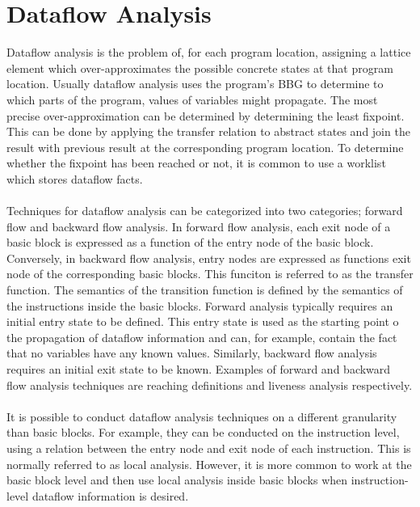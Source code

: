 \documentclass{kththesis}
\begin{document}
\section{Dataflow Analysis}
Dataflow analysis is the problem of, for each program location, assigning a lattice element which over-approximates the possible concrete states at that program location\cite{cpaAlgo}. Usually dataflow analysis uses the program's BBG to determine to which parts of the program, values of variables might propagate. The most precise over-approximation can be determined by determining the least fixpoint. This can be done by applying the transfer relation to abstract states and join the result with previous result at the corresponding program location. To determine whether the fixpoint has been reached or not, it is common to use a worklist which stores dataflow facts\cite{cpaAlgo}.
\\ \\
Techniques for dataflow analysis can be categorized into two categories; forward flow and backward flow analysis. In forward flow analysis, each exit node of a basic block is expressed as a function of the entry node of the basic block. Conversely, in backward flow analysis, entry nodes are expressed as functions exit node of the corresponding basic blocks. This funciton is referred to as the transfer function. The semantics of the transition function is defined by the semantics of the instructions inside the basic blocks. Forward analysis typically requires an initial entry state to be defined. This entry state is used as the starting point o the propagation of dataflow information and can, for example, contain the fact that no variables have any known values. Similarly, backward flow analysis requires an initial exit state to be known. Examples of forward and backward flow analysis techniques are reaching definitions and liveness analysis respectively.
\\ \\
It is possible to conduct dataflow analysis techniques on a different granularity than basic blocks. For example, they can be conducted on the instruction level, using a relation between the entry node and exit node of each instruction. This is normally referred to as local analysis\cite{carneigeDataFlow}. However, it is more common to work at the basic block level and then use local analysis inside basic blocks when instruction-level dataflow information is desired\cite{carneigeDataFlow}.
\end{document}

